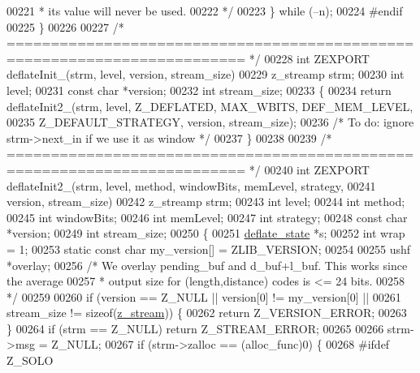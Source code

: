 \begin{DoxyCode}
00221 \textcolor{comment}{         * its value will never be used.}
00222 \textcolor{comment}{         */}
00223     \} \textcolor{keywordflow}{while} (--n);
00224 \textcolor{preprocessor}{#endif}
00225 \}
00226 
00227 \textcolor{comment}{/* ========================================================================= */}
00228 \textcolor{keywordtype}{int} ZEXPORT deflateInit\_(strm, level, version, stream\_size)
00229     z\_streamp strm;
00230     \textcolor{keywordtype}{int} level;
00231     \textcolor{keyword}{const} \textcolor{keywordtype}{char} *version;
00232     \textcolor{keywordtype}{int} stream\_size;
00233 \{
00234     \textcolor{keywordflow}{return} deflateInit2\_(strm, level, Z\_DEFLATED, MAX\_WBITS, DEF\_MEM\_LEVEL,
00235                          Z\_DEFAULT\_STRATEGY, version, stream\_size);
00236     \textcolor{comment}{/* To do: ignore strm->next\_in if we use it as window */}
00237 \}
00238 
00239 \textcolor{comment}{/* ========================================================================= */}
00240 \textcolor{keywordtype}{int} ZEXPORT deflateInit2\_(strm, level, method, windowBits, memLevel, strategy,
00241                   version, stream\_size)
00242     z\_streamp strm;
00243     \textcolor{keywordtype}{int}  level;
00244     \textcolor{keywordtype}{int}  method;
00245     \textcolor{keywordtype}{int}  windowBits;
00246     \textcolor{keywordtype}{int}  memLevel;
00247     \textcolor{keywordtype}{int}  strategy;
00248     \textcolor{keyword}{const} \textcolor{keywordtype}{char} *version;
00249     \textcolor{keywordtype}{int} stream\_size;
00250 \{
00251     \hyperlink{structinternal__state}{deflate\_state} *s;
00252     \textcolor{keywordtype}{int} wrap = 1;
00253     \textcolor{keyword}{static} \textcolor{keyword}{const} \textcolor{keywordtype}{char} my\_version[] = ZLIB\_VERSION;
00254 
00255     ushf *overlay;
00256     \textcolor{comment}{/* We overlay pending\_buf and d\_buf+l\_buf. This works since the average}
00257 \textcolor{comment}{     * output size for (length,distance) codes is <= 24 bits.}
00258 \textcolor{comment}{     */}
00259 
00260     \textcolor{keywordflow}{if} (version == Z\_NULL || version[0] != my\_version[0] ||
00261         stream\_size != \textcolor{keyword}{sizeof}(\hyperlink{structz__stream__s}{z\_stream})) \{
00262         \textcolor{keywordflow}{return} Z\_VERSION\_ERROR;
00263     \}
00264     \textcolor{keywordflow}{if} (strm == Z\_NULL) \textcolor{keywordflow}{return} Z\_STREAM\_ERROR;
00265 
00266     strm->msg = Z\_NULL;
00267     \textcolor{keywordflow}{if} (strm->zalloc == (alloc\_func)0) \{
00268 \textcolor{preprocessor}{#ifdef Z\_SOLO}

\end{DoxyCode}
